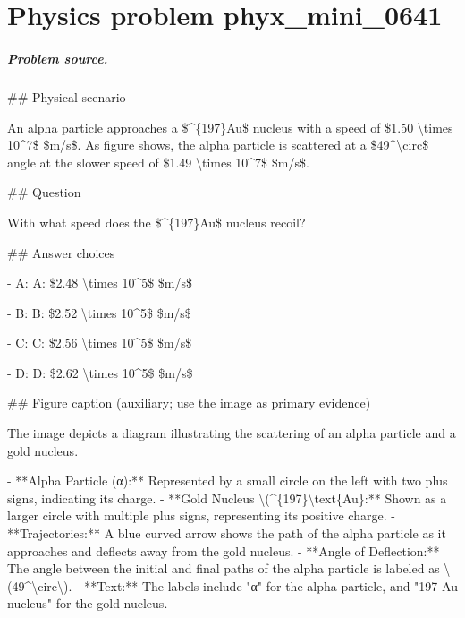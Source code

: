 
\chapter{Physics problem phyx\_mini\_0641}
\label{ch:PhyXMiniProblems_problem_phyx_mini_0641}

\paragraph{Problem source.}
\#\# Physical scenario

An alpha particle approaches a \$\textasciicircum{}\{197\}Au\$ nucleus with a speed of \$1.50 \textbackslash{}times 10\textasciicircum{}7\$ \$m/s\$. As figure shows, the alpha particle is scattered at a \$49\textasciicircum{}\textbackslash{}circ\$ angle at the slower speed of \$1.49 \textbackslash{}times 10\textasciicircum{}7\$ \$m/s\$.

\#\# Question

With what speed does the \$\textasciicircum{}\{197\}Au\$ nucleus recoil?

\#\# Answer choices

- A: A: \$2.48 \textbackslash{}times 10\textasciicircum{}5\$ \$m/s\$

- B: B: \$2.52 \textbackslash{}times 10\textasciicircum{}5\$ \$m/s\$

- C: C: \$2.56 \textbackslash{}times 10\textasciicircum{}5\$ \$m/s\$

- D: D: \$2.62 \textbackslash{}times 10\textasciicircum{}5\$ \$m/s\$

\#\# Figure caption (auxiliary; use the image as primary evidence)

The image depicts a diagram illustrating the scattering of an alpha particle and a gold nucleus. 

- **Alpha Particle (α):** Represented by a small circle on the left with two plus signs, indicating its charge.
- **Gold Nucleus \textbackslash{}(\textasciicircum{}\{197\}\textbackslash{}text\{Au\}:** Shown as a larger circle with multiple plus signs, representing its positive charge.
- **Trajectories:** A blue curved arrow shows the path of the alpha particle as it approaches and deflects away from the gold nucleus.
- **Angle of Deflection:** The angle between the initial and final paths of the alpha particle is labeled as \textbackslash{}(49\textasciicircum{}\textbackslash{}circ\textbackslash{}).
- **Text:** The labels include "α" for the alpha particle, and "197 Au nucleus" for the gold nucleus.

